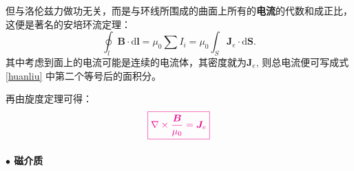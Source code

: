 \documentclass[10pt,reqno, final]{ctexart}
\begin{document}
但与洛伦兹力做功无关，而是与环线所围成的曲面上所有的\textbf{电流}的代数和成正比，这便是著名的安培环流定理：
\begin{equation}\label{huanliu}
\displaystyle  \oint_l \bm{B}\cdot \mathrm{d}\bm{l} =  \mu_0\sum{I_i} = \mu_0\int_S \bm{J}_e \cdot \mathrm{d}\bm{S}.
\end{equation}
其中考虑到面上的电流可能是连续的电流体，其密度就为$\bm{J}_e$, 则总电流便可写成式\eqref{huanliu} 中第二个等号后的面积分。

再由旋度定理可得：
\begin{equation}\label{cichanghuanliudingli}
\color{magenta}\boxed{\nabla\times\frac{\bm{B}}{\mu_0} = \bm{J}_e}
\end{equation}


\paragraph{$\bullet$ 磁介质}









\end{document}

